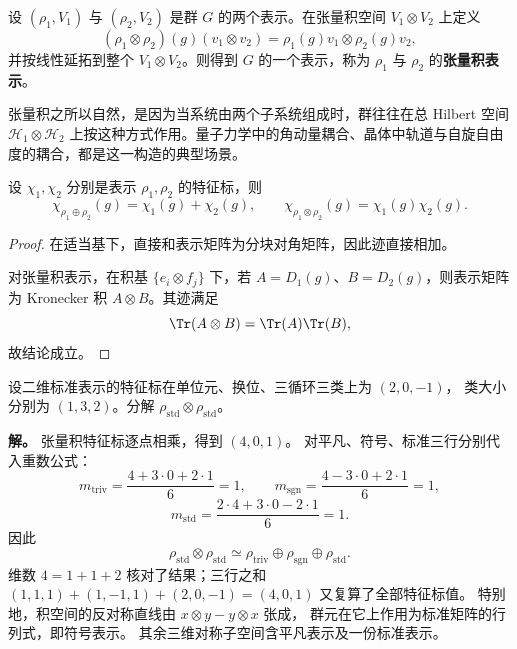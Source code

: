 \begin{definition}[张量积表示]
设 $(\rho_1,V_1)$ 与 $(\rho_2,V_2)$ 是群 $G$ 的两个表示。在张量积空间 $V_1\otimes V_2$ 上定义
\[
(\rho_1\otimes\rho_2)(g)(v_1\otimes v_2)
=\rho_1(g)v_1\otimes \rho_2(g)v_2,
\]
并按线性延拓到整个 $V_1\otimes V_2$。则得到 $G$ 的一个表示，称为 $\rho_1$ 与 $\rho_2$ 的\textbf{张量积表示}。
\label{def:tensor-product-representation}
\end{definition}

张量积之所以自然，是因为当系统由两个子系统组成时，群往往在总 Hilbert 空间 $\mathcal H_1\otimes \mathcal H_2$ 上按这种方式作用。量子力学中的角动量耦合、晶体中轨道与自旋自由度的耦合，都是这一构造的典型场景。

\begin{proposition}[特征标对直接和与张量积的行为]
设 $\chi_1,\chi_2$ 分别是表示 $\rho_1,\rho_2$ 的特征标，则
\[
\chi_{\rho_1\oplus\rho_2}(g)=\chi_1(g)+\chi_2(g),
\qquad
\chi_{\rho_1\otimes\rho_2}(g)=\chi_1(g)\chi_2(g).
\]
\label{prop:character-sum-product}

\end{proposition}

\begin{proof}
在适当基下，直接和表示矩阵为分块对角矩阵，因此迹直接相加。

对张量积表示，在积基 $\{e_i\otimes f_j\}$ 下，若 $A=D_1(g)$、$B=D_2(g)$，则表示矩阵为 Kronecker 积 $A\otimes B$。其迹满足
\[
\Tr(A\otimes B)=\Tr(A)\Tr(B),
\]
故结论成立。
\end{proof}

\begin{example}
设二维标准表示的特征标在单位元、换位、三循环三类上为 $(2,0,-1)$，
类大小分别为 $(1,3,2)$。分解 $\rho_{\mathrm{std}}\otimes\rho_{\mathrm{std}}$。

\textbf{解。} 张量积特征标逐点相乘，得到 $(4,0,1)$。
对平凡、符号、标准三行分别代入重数公式：
\[
m_{\mathrm{triv}}=\frac{4+3\cdot0+2\cdot1}{6}=1,\qquad
m_{\mathrm{sgn}}=\frac{4-3\cdot0+2\cdot1}{6}=1,
\]
\[
m_{\mathrm{std}}=\frac{2\cdot4+3\cdot0-2\cdot1}{6}=1.
\]
因此
\[
\rho_{\mathrm{std}}\otimes\rho_{\mathrm{std}}
\simeq\rho_{\mathrm{triv}}\oplus\rho_{\mathrm{sgn}}\oplus\rho_{\mathrm{std}}.
\]
维数 $4=1+1+2$ 核对了结果；三行之和
$(1,1,1)+(1,-1,1)+(2,0,-1)=(4,0,1)$ 又复算了全部特征标值。
特别地，积空间的反对称直线由 $x\otimes y-y\otimes x$ 张成，
群元在它上作用为标准矩阵的行列式，即符号表示。
其余三维对称子空间含平凡表示及一份标准表示。
\end{example}


